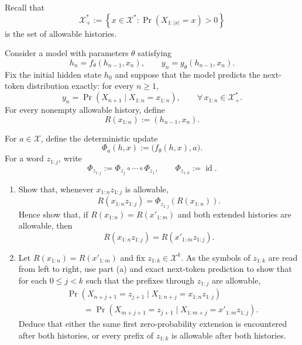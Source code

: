 \documentclass[11pt]{article}
\begin{document}
\begin{exercise}
\label{ex:p2-4}
  Recall that
  \[
    \mathcal X_+^*
      :=\left\{x\in\mathcal X^*:
        \Pr\!\left(X_{1:|x|}=x\right)>0\right\}
  \]
  is the set of allowable histories.

  Consider a model with parameters $\theta$ satisfying
  \[
    h_n=f_\theta(h_{n-1},x_n),
    \qquad
    y_n=g_\theta(h_{n-1},x_n).
  \]
  Fix the initial hidden state $h_0$ and suppose that the model predicts the
  next-token distribution exactly: for every $n\geq1$,
  \[
    y_n
      =\Pr\!\left(
        X_{n+1}\mid X_{1:n}=x_{1:n}
      \right),
      \qquad \forall\,x_{1:n}\in\mathcal X_+^*.
  \]
  For every nonempty allowable history, define
  \[
    R(x_{1:n}):=(h_{n-1},x_n).
  \]

  For $a\in\mathcal X$, define the deterministic update
  \[
    \Phi_a(h,x):=\bigl(f_\theta(h,x),a\bigr).
  \]
  For a word $z_{1:j}$, write
  \[
    \Phi_{z_{1:j}}
      :=\Phi_{z_j}\circ\cdots\circ\Phi_{z_1},
    \qquad
    \Phi_{z_{1:0}}:=\operatorname{id}.
  \]

  \begin{enumerate}
    \item Show that, whenever $x_{1:n}z_{1:j}$ is allowable,
      \[
        R(x_{1:n}z_{1:j})
          =\Phi_{z_{1:j}}\!\left(R(x_{1:n})\right).
      \]
      Hence show that, if $R(x_{1:n})=R(x'_{1:m})$ and both extended
      histories are allowable, then
      \[
        R(x_{1:n}z_{1:j})=R(x'_{1:m}z_{1:j}).
      \]

    \item Let $R(x_{1:n})=R(x'_{1:m})$ and fix
      $z_{1:k}\in\mathcal X^k$. As the symbols of $z_{1:k}$ are read from
      left to right, use part (a) and exact next-token prediction to show that
      for each $0\leq j<k$ such that the prefixes through $z_{1:j}$ are
      allowable,
      \[
        \begin{aligned}
        &\Pr\!\left(
          X_{n+j+1}=z_{j+1}
          \mid X_{1:n+j}=x_{1:n}z_{1:j}
        \right)\\
        &\qquad=
        \Pr\!\left(
          X_{m+j+1}=z_{j+1}
          \mid X_{1:m+j}=x'_{1:m}z_{1:j}
        \right).
        \end{aligned}
      \]
      Deduce that either the same first zero-probability extension is
      encountered after both histories, or every prefix of $z_{1:k}$ is
      allowable after both histories.


\end{enumerate}
\end{exercise}
\end{document}
